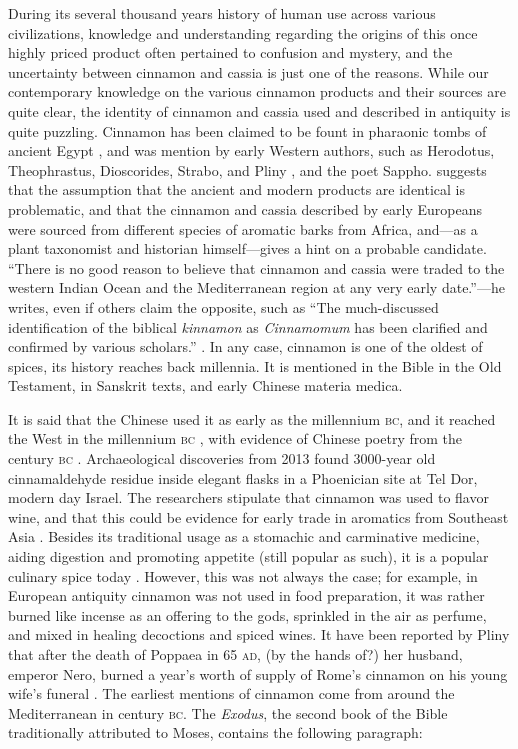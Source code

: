 During its several thousand years history of human use across various civilizations, knowledge and understanding regarding the origins of this once highly priced product often pertained to confusion and mystery, and the uncertainty between cinnamon and cassia is just one of the reasons. While our contemporary knowledge on the various cinnamon products and their sources are quite clear, the identity of cinnamon and cassia used and described in antiquity is quite puzzling. Cinnamon has been claimed to be fount in pharaonic tombs of ancient Egypt \autocite[see Meyerhof and Sobhy in][471,475]{al-ghafiki_abridged_1932}, and was mention by early Western authors, such as Herodotus, Theophrastus, Dioscorides, Strabo, and Pliny \autocite[541]{laufer_sino-iranica_1919}, and the poet Sappho. \textcite{haw_cinnamon_2017} suggests that the assumption that the ancient and modern products are identical is problematic, and that the cinnamon and cassia described by early Europeans were sourced from different species of aromatic barks from Africa, and---as a plant taxonomist and historian himself---gives a hint on a probable candidate. ``There is no good reason to believe that cinnamon and cassia were traded to the western Indian Ocean and the Mediterranean region at any very early date.''---he writes, even if others claim the opposite, such as ``The much-discussed identification of the biblical \textit{kinnamon} as \textit{Cinnamomum} has been clarified and confirmed by various scholars.'' \autocite[202]{zohary_plants_1982}. In any case, cinnamon is one of the oldest of spices, its history reaches back millennia. It is mentioned in the Bible in the Old Testament, in Sanskrit texts, and early Chinese \gls{materia medica}.

It is said that the Chinese used it as early as the  millennium \textsc{bc}, and it reached the West in the  millennium \textsc{bc} \autocites{dietrich_dar_2004}, with evidence of Chinese poetry from the  century \textsc{bc} \autocite[38]{dalby_dangerous_2000}. Archaeological discoveries from 2013 found 3000-year old cinnamaldehyde residue inside elegant flasks in a Phoenician site at Tel Dor, modern day Israel. The researchers stipulate that cinnamon was used to flavor wine, and that this could be evidence for early trade in aromatics from Southeast Asia \autocite{namdar_cinnamaldehyde_2013}. Besides its traditional usage as a stomachic and carminative medicine, aiding digestion and promoting appetite (still popular as such), it is a popular culinary spice today \autocite{ulbricht_evidence-based_2011}. However, this was not always the case; for example, in European antiquity cinnamon was not used in food preparation, it was rather burned like incense as an offering to the gods, sprinkled in the air as perfume, and mixed in healing decoctions and spiced wines. It have been reported by Pliny that after the death of Poppaea in 65 \textsc{ad}, (by the hands of?) her husband, emperor Nero, burned a year's worth of supply of Rome's cinnamon on his young wife's funeral \autocite{counts_regum_1996}. The earliest mentions of cinnamon come from around the Mediterranean in  century \textsc{bc}. The \textit{Exodus}, the second book of the Bible traditionally attributed to Moses, contains the following paragraph: 

